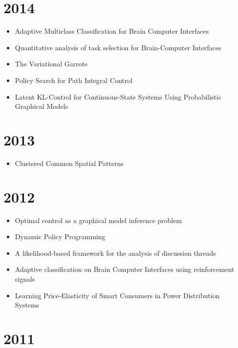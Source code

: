\documentclass{article}
\begin{document}
\section*{2014}

\begin{itemize}
\item Adaptive Multiclass Classification for Brain Computer Interfaces~\cite{Llera_2014}
\item Quantitative analysis of task selection for Brain-Computer Interfaces~\cite{tasksel}
\item The Variational Garrote~\cite{Kappen2014}
\item Policy Search for Path Integral Control~\cite{pireps}
\item Latent KL-Control for Continuous-State Systems Using Probabilistic Graphical Models~\cite{latentkl}
\end{itemize}

\section*{2013}

\begin{itemize}
\item Clustered Common Spatial Patterns~\cite{ccsps}
\end{itemize}

\section*{2012}
\begin{itemize}
\item Optimal control as a graphical model inference problem~\cite{springerlink:10.1007/s10994-012-5278-7}
\item Dynamic Policy Programming~\cite{azar12a}
\item A likelihood-based framework for the analysis of discussion threads~\cite{gomez13www}
\item Adaptive classification on Brain Computer Interfaces using reinforcement signals~\cite{Llera_2012}
\item Learning Price-Elasticity of Smart Consumers in Power Distribution Systems~\cite{gomez2012learning}
\end{itemize}

\section*{2011}
\end{document}
